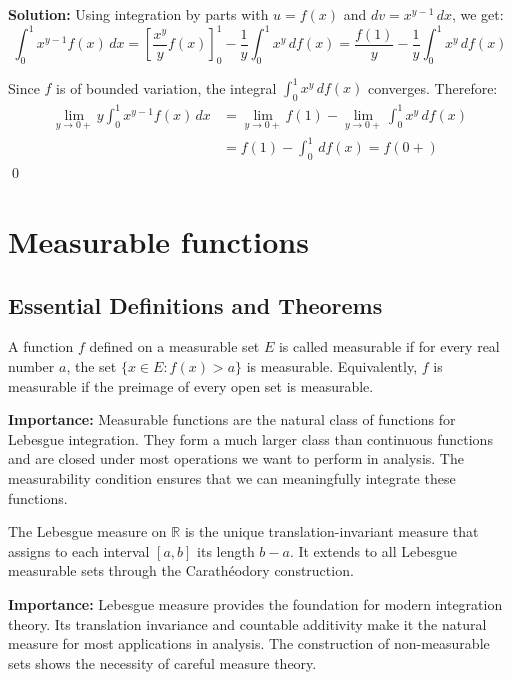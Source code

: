 \bigskip\noindent\textbf{Solution:}
Using integration by parts with $u = f(x)$ and $dv = x^{y-1} \, dx$, we get:
\[\int_0^1 x^{y-1}f(x) \, dx = \left[\frac{x^y}{y} f(x)\right]_0^1 - \frac{1}{y} \int_0^1 x^y \, df(x) = \frac{f(1)}{y} - \frac{1}{y} \int_0^1 x^y \, df(x)\]

Since $f$ is of bounded variation, the integral $\int_0^1 x^y \, df(x)$ converges. Therefore:
\begin{align*}
\lim_{y \to 0+} y \int_0^1 x^{y-1}f(x) \, dx &= \lim_{y \to 0+} f(1) - \lim_{y \to 0+} \int_0^1 x^y \, df(x) \\
&= f(1) - \int_0^1 \, df(x) = f(0+)
\end{align*}\qed

\section{Measurable functions}

\subsection*{Essential Definitions and Theorems}

\begin{definition}
A function $f$ defined on a measurable set $E$ is called measurable if for every real number $a$, the set $\{x \in E : f(x) > a\}$ is measurable. Equivalently, $f$ is measurable if the preimage of every open set is measurable.
\end{definition}

\noindent\textbf{Importance:} Measurable functions are the natural class of functions for Lebesgue integration. They form a much larger class than continuous functions and are closed under most operations we want to perform in analysis. The measurability condition ensures that we can meaningfully integrate these functions.



\begin{definition}
The Lebesgue measure on $\mathbb{R}$ is the unique translation-invariant measure that assigns to each interval $[a, b]$ its length $b - a$. It extends to all Lebesgue measurable sets through the Carathéodory construction.
\end{definition}

\noindent\textbf{Importance:} Lebesgue measure provides the foundation for modern integration theory. Its translation invariance and countable additivity make it the natural measure for most applications in analysis. The construction of non-measurable sets shows the necessity of careful measure theory.



